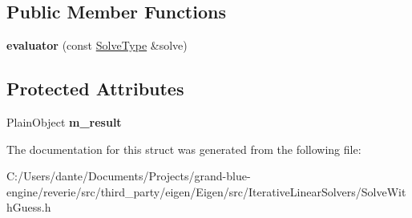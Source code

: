 \subsection*{Public Member Functions}
\begin{DoxyCompactItemize}
\item 
\mbox{\label{struct_eigen_1_1internal_1_1evaluator_3_01_solve_with_guess_3_01_decomposition_00_01_rhs_type_00_01_guess_type_01_4_01_4_a767caca47bbafe10dd98680f780f7959}} 
{\bfseries evaluator} (const \mbox{\hyperlink{class_eigen_1_1_solve_with_guess}{Solve\+Type}} \&solve)
\end{DoxyCompactItemize}
\subsection*{Protected Attributes}
\begin{DoxyCompactItemize}
\item 
\mbox{\label{struct_eigen_1_1internal_1_1evaluator_3_01_solve_with_guess_3_01_decomposition_00_01_rhs_type_00_01_guess_type_01_4_01_4_aff64883b1bb7c107c0ed28c6755b9772}} 
Plain\+Object {\bfseries m\+\_\+result}
\end{DoxyCompactItemize}


The documentation for this struct was generated from the following file\+:\begin{DoxyCompactItemize}
\item 
C\+:/\+Users/dante/\+Documents/\+Projects/grand-\/blue-\/engine/reverie/src/third\+\_\+party/eigen/\+Eigen/src/\+Iterative\+Linear\+Solvers/Solve\+With\+Guess.\+h\end{DoxyCompactItemize}
